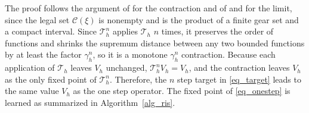 \documentclass[lettersize,journal]{IEEEtran}
\newcommand{\calC}{\mathcal{C}}
\newcommand{\calT}{\mathcal{T}}
\begin{document}
The proof follows the argument of \cite[Theorem~2]{li2023cdc} for the contraction and of \cite[Proposition~1]{fisac2019} and \cite[Proposition~1]{li2023cdc} for the limit, since the legal set $\calC(\xi)$ is nonempty and is the product of a finite gear set and a compact interval. Since $\calT_h^{n}$ applies $\calT_h$ $n$ times, it preserves the order of functions and shrinks the supremum distance between any two bounded functions by at least the factor $\gamma_h^{n}$, so it is a monotone $\gamma_h^{n}$ contraction. Because each application of $\calT_h$ leaves $V_h$ unchanged, $\calT_h^{n} V_h = V_h$, and the contraction leaves $V_h$ as the only fixed point of $\calT_h^{n}$. Therefore, the $n$ step target in \eqref{eq_target} leads to the same value $V_h$ as the one step operator. The fixed point of \eqref{eq_onestep} is learned as summarized in Algorithm~\ref{alg_ris}.
\end{document}
